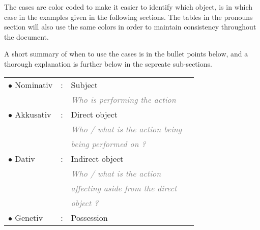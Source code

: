 \documentclass[a4paper,twocolumn,10pt]{article}
\newcommand{\bulletpoint}
{ $\bullet$  }
\newcommand{\newpar}
{\par \vspace{0.3cm}}
\begin{document}
\linenumbers

\vspace{0.2cm}

The cases are color coded to make it easier to identify which object, is in
which case in the examples given in the following sections. The tables in the
pronouns section will also use the same colors in order to maintain consistency
throughout the document.\newpar

A short summary of when to use the cases is in the bullet points below, and a
thorough explanation is further below in the sepreate sub-sections.


\nolinenumbers

\vspace{0.2cm}

\begin{tabularx}{0.95\linewidth}{lllX}


\rowcolor{white} \bulletpoint Nominativ & : &  Subject \\
\rowcolor{white} & &\textcolor{gray}{ \textit{Who is performing the action} }\\

\rowcolor{white} \bulletpoint Akkusativ & : &  Direct object\\
\rowcolor{white} & &\textcolor{gray}{ \textit{Who / what is the action being} }\\
\rowcolor{white} & &\textcolor{gray}{ \textit{being performed on ?} }\\

\rowcolor{white}  \bulletpoint Dativ & : &  Indirect object \\

\rowcolor{white} & &\textcolor{gray}{ \textit{Who / what is the action } }\\
\rowcolor{white} & &\textcolor{gray}{ \textit{ affecting aside from the direct } }\\
\rowcolor{white} & &\textcolor{gray}{ \textit{ object ?} }\\

\rowcolor{white}  \bulletpoint Genetiv & : &  Possession\\

\end{tabularx}

\vspace{0.2cm}

\linenumbers

\end{document}
